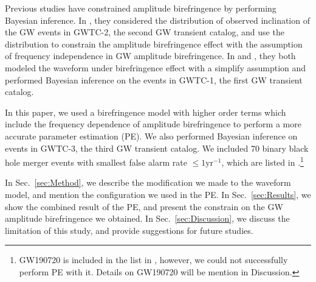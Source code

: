 \documentclass[reprint,amsmath,amssymb,aps,twocolumn]{aastex631}
\begin{document}
Previous studies have constrained amplitude birefringence by performing Bayesian inference.
In \citet{Maria_2021}, they considered the distribution of observed inclination of the GW events in GWTC-2, the second GW transient catalog, and use the distribution to constrain the amplitude birefringence effect with the assumption of frequency independence in GW amplitude birefringence.
In \citet{Yamada_2020} and \citet{Wang_2021}, they both modeled the waveform under birefringence effect with a simplify assumption and performed Bayesian inference on the events in GWTC-1, the first GW transient catalog.

In this paper, we used a birefringence model with higher order terms which include the frequency dependence of amplitude birefringence to perform a more accurate parameter estimation (PE).
We also performed Bayesian inference on events in GWTC-3, the third GW transient catalog.
We included 70 binary black hole merger events with smallest false alarm rate $\leq1\mathrm{yr^{-1}}$, which are listed in \citet{GWTC_3_population}.\footnote{GW190720 is included in the list in \citet{GWTC_3_population}, however, we could not successfully perform PE with it. Details on GW190720 will be mention in Discussion.}

In Sec.~\ref{sec:Method}, we describe the modification we made to the waveform model, and mention the configuration we used in the PE.
In Sec.~\ref{sec:Results}, we show the combined result of the PE, and present the constrain on the GW amplitude birefringence we obtained.
In Sec.~\ref{sec:Discussion}, we discuss the limitation of this study, and provide suggestions for future studies.
\end{document}
